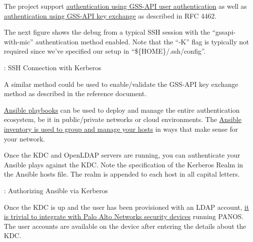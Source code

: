 \justifying
The project support \href{https://www.rfc-editor.org/rfc/rfc4462.html#page-13}{authentication using GSS-API user authentication} as well as \href{https://www.rfc-editor.org/rfc/rfc4462.html#page-19}{authentication using GSS-API key exchange} as described in RFC 4462\cite{rfc4462}.

\justifying
The next figure shows the debug from a typical SSH session with the ``gssapi-with-mic'' authentication method enabled. Note that the ``-K'' flag is typically not required since
we've specified our setup in ``\$\{HOME\}/.ssh/config''.

\vspace{2mm}
\begin{mybox}{\thetcbcounter: SSH Connection with Kerberos}
	
\end{mybox}

\justifying
A similar method could be used to enable/validate the GSS-API key exchange method as described in the reference document\cite{rfc4462}.

\vspace{2mm}
\vspace{2mm}

\justifying
\href{https://www.ansible.com/overview/how-ansible-works}{Ansible playbooks} can be used to deploy and manage the entire authentication ecosystem,
be it in public/private networks or cloud environments. The \href{https://docs.ansible.com/ansible/2.3/intro_inventory.html#hosts-and-groups}{Ansible inventory is used to group and manage your hosts} in ways that make sense for your 
network.

\justifying
Once the KDC and OpenLDAP servers are running, you can authenticate your Ansible plays against the KDC. Note the specification of the Kerberos Realm in the Ansible hosts file. The realm is appended to each host in all capital letters.

\begin{mybox}{\thetcbcounter: Authorizing Ansible via Kerberos}
	
\end{mybox}

\vspace{2mm}
\vspace{2mm}

\justifying
Once the KDC is up and the user has been provisioned with an LDAP account, \href{https://docs.paloaltonetworks.com/pan-os/10-0/pan-os-admin/authentication/configure-kerberos-server-authentication.html}{it is trivial to integrate with 
Palo Alto Networks security devices} running PANOS. The user accounts are available on the device after entering the details about
the KDC.

